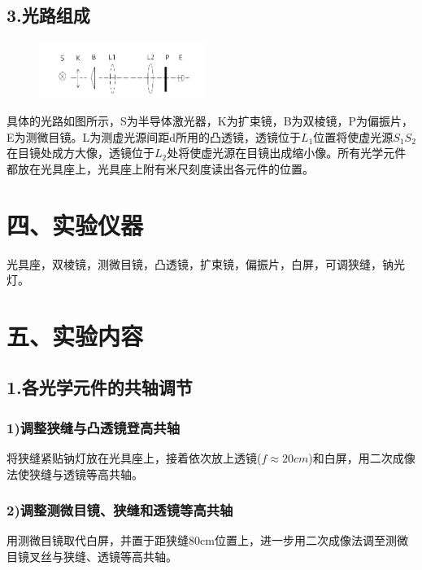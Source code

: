 \documentclass[11pt,a4paper,oneside]{article}
\begin{document}
\subsection*{3.光路组成}
\begin{figure}
  \vspace{-20pt}
  \begin{center}
    \includegraphics[width=0.48\textwidth]{Image/Instrument1071.png}
  \end{center}
  \vspace{-20pt}
  \vspace{-10pt}
\end{figure}
 具体的光路如图所示，S为半导体激光器，K为扩束镜，B为双棱镜，P为偏振片，E为测微目镜。L为测虚光源间距d所用的凸透镜，透镜位于${L_1}$位置将使虚光源${S_1}{S_2}$在目镜处成方大像，透镜位于${L_2}$处将使虚光源在目镜出成缩小像。所有光学元件都放在光具座上，光具座上附有米尺刻度读出各元件的位置。
 
\section*{四、实验仪器}
   光具座，双棱镜，测微目镜，凸透镜，扩束镜，偏振片，白屏，可调狭缝，钠光灯。
   
\section*{五、实验内容}

\subsection*{1.各光学元件的共轴调节}
\subsubsection*{1)调整狭缝与凸透镜登高共轴}
将狭缝紧贴钠灯放在光具座上，接着依次放上透镜($f\approx 20cm$)和白屏，用二次成像法使狭缝与透镜等高共轴。
\subsubsection*{2)调整测微目镜、狭缝和透镜等高共轴}
用测微目镜取代白屏，并置于距狭缝80cm位置上，进一步用二次成像法调至测微目镜叉丝与狭缝、透镜等高共轴。
\end{document}
